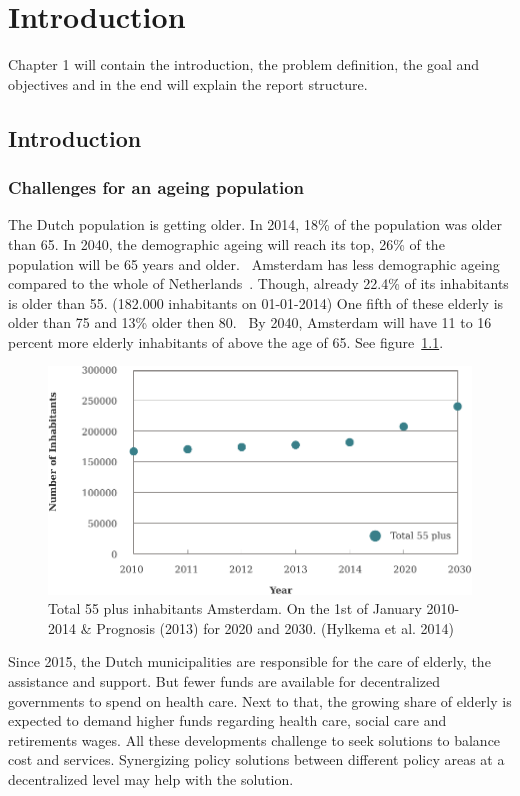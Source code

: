 \chapter[Introduction]{Introduction}
Chapter 1 will contain the introduction, the problem definition, the goal and objectives and in the end will explain the report structure.

\section[Introduction]{Introduction}
\subsection{Challenges for an ageing population}
The Dutch population is getting older. In 2014, 18\% of the population was older than 65. In 2040, the demographic ageing will reach its top, 26\% of the population will be 65 years and older.~\cite{Hylkema2014} Amsterdam has less demographic ageing compared to the whole of Netherlands~\cite{Hylkema2014}. Though, already 22.4\% of its inhabitants is older than 55. (182.000 inhabitants on 01-01-2014) One fifth of these elderly is older than 75 and 13\% older then 80.~\cite{Hylkema2014} By 2040, Amsterdam will have 11 to 16 percent more elderly inhabitants of above the age of 65. See figure~\ref{demo}.

\begin{figure}[h]
\includegraphics[width=\textwidth]{img/I1_number_elderly.pdf}
\centering
\caption[Total 55 plus inhabitants Amsterdam.]{
Total 55 plus inhabitants Amsterdam. On the 1st of January 2010-2014 \& Prognosis (2013) for 2020 and 2030. (Hylkema et al. 2014)} 
\label{demo}
\end{figure} 

Since 2015, the Dutch municipalities are responsible for the care of elderly, the assistance and support. But fewer funds are available for decentralized governments to spend on health care. Next to that, the growing share of elderly is expected to demand higher funds regarding health care, social care and retirements wages. All these developments challenge to seek solutions to balance cost and services. Synergizing policy solutions between different policy areas at a decentralized level may help with the solution.~\cite{Hylkema2014} 

